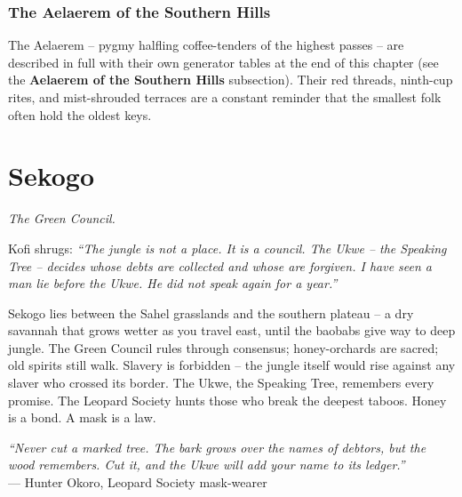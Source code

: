 \documentclass[12pt,oneside]{book}
\begin{document}
\subsection*{The Aelaerem of the Southern Hills}
The Aelaerem -- pygmy halfling coffee-tenders of the highest passes -- are described in full with their own generator tables at the end of this chapter (see the \textbf{Aelaerem of the Southern Hills} subsection). Their red threads, ninth-cup rites, and mist-shrouded terraces are a constant reminder that the smallest folk often hold the oldest keys.

\newpage

\newpage

\chapter{Sekogo}
\emph{The Green Council.}

\noindent
Kofi shrugs: \textit{``The jungle is not a place. It is a council. The Ukwe -- the Speaking Tree -- decides whose debts are collected and whose are forgiven. I have seen a man lie before the Ukwe. He did not speak again for a year.''}

\noindent
Sekogo lies between the Sahel grasslands and the southern plateau -- a dry savannah that grows wetter as you travel east, until the baobabs give way to deep jungle. The Green Council rules through consensus; honey-orchards are sacred; old spirits still walk. Slavery is forbidden -- the jungle itself would rise against any slaver who crossed its border. The Ukwe, the Speaking Tree, remembers every promise. The Leopard Society hunts those who break the deepest taboos. Honey is a bond. A mask is a law.

\vspace{0.5em}
\noindent\textit{``Never cut a marked tree. The bark grows over the names of debtors, but the wood remembers. Cut it, and the Ukwe will add your name to its ledger.''} \\
--- Hunter Okoro, Leopard Society mask-wearer
\end{document}
